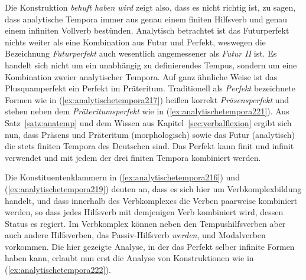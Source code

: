 
Die Konstruktion \textit{behuft haben wird} zeigt also, dass es nicht richtig ist, zu sagen, dass analytische Tempora immer aus genau einem finiten Hilfsverb und genau einem infiniten Vollverb bestünden.
Analytisch betrachtet ist das Futurperfekt nichts weiter als eine Kombination aus Futur und Perfekt, weswegen die Bezeichnung \textit{Futurperfekt} auch wesentlich angemessener als \textit{Futur II} ist.
Es handelt sich nicht um ein unabhängig zu definierendes Tempus, sondern um eine Kombination zweier analytischer Tempora.
Auf ganz ähnliche Weise ist das Plusquamperfekt ein Perfekt im Präteritum.
Traditionell als \textit{Perfekt} bezeichnete Formen wie in (\ref{ex:analytischetempora217}) heißen korrekt \textit{Präsensperfekt} und stehen neben dem \textit{Präteritumsperfekt} wie in (\ref{ex:analytischetempora221}).
Aus Satz~\ref{satz:anatemp} und dem Wissen aus Kapitel~\ref{sec:verbalflexion} ergibt sich nun, dass Präsens und Präteritum (morphologisch) sowie das Futur (analytisch) die stets finiten Tempora des Deutschen sind.
Das Perfekt kann finit und infinit verwendet und mit jedem der drei finiten Tempora kombiniert werden.


Die Konstituentenklammern in (\ref{ex:analytischetempora216}) und (\ref{ex:analytischetempora219}) deuten an, dass es sich hier um Verbkomplexbildung handelt, und dass innerhalb des Verbkomplexes die Verben paarweise kombiniert werden, so dass jedes Hilfsverb mit demjenigen Verb kombiniert wird, dessen Status es regiert.
Im Verbkomplex können neben den Tempushilfsverben aber auch andere Hilfsverben, \zB das Passiv-Hilfsverb \textit{werden}, und Modalverben vorkommen.
Die hier gezeigte Analyse, in der das Perfekt selber infinite Formen haben kann, erlaubt nun erst die Analyse von Konstruktionen wie in (\ref{ex:analytischetempora222}).

\begin{exe}
  \ex\label{ex:analytischetempora222}
  \begin{xlist}
  \end{xlist}
\end{exe}

